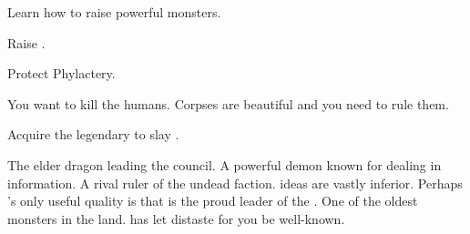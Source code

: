 \documentclass[char]{guildcamp2}
\begin{document}
\begin{itemz}[Goals]
  \item Learn how to raise powerful monsters.
  \item Raise \cOnyx{}.
  \item Protect Phylactery.
  \item You want to kill the humans. Corpses are beautiful and you need to rule them.
  \item Acquire the legendary \iSwordofIce{} to slay \cOnyx{}.
\end{itemz}

\begin{contacts}
  \contact{\cOnyx{}} The elder dragon leading the council.
  \contact{\cDemon{}} A powerful demon known for dealing in information.
  \contact{\cVampire{}} A rival ruler of the undead faction. \cVampire{\Their} ideas are vastly inferior. Perhaps \cVampire{\full}'s only useful quality is that \cVampire{\they} is the proud leader of the \bLoremasters{}.
	\contact{\cEnt{}} One of the oldest monsters in the land. \cEnt{\full} has let \cEnt{\their} distaste for you be well-known.
\end{contacts}
\end{document}
